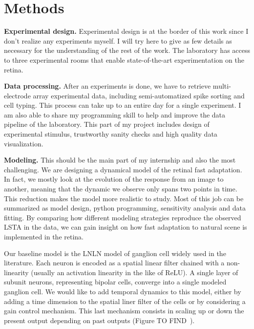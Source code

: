 \section{Methods}\label{sec:methods}

\textbf{Experimental design.}
Experimental design is at the border of this work since I don't realize any
experiments myself. I will try here to give as few details as necessary for the
understanding of the rest of the work.
The laboratory has access to three experimental rooms that enable
state-of-the-art experimentation
on the retina.

\tab\textbf{Data processing.}
After an experiments is done, we have to retrieve multi-electrode array
experimental data, including semi-automatized spike sorting and cell typing.
This process can take up to an entire day for a single experiment. I am also
able to share my programming skill to help and improve the data pipeline of the
laboratory. This part of my project includes design of experimental stimulus,
trustworthy sanity checks and high quality data visualization.

\textbf{Modeling.} This should be the main part of my internship and also the
most challenging. We are designing a dynamical model of the retinal fast
adaptation. In fact, we mostly look at the evolution of the response from an
image to another, meaning that the dynamic we observe only spans two points in
time. This reduction makes the model more realistic to study. Most of this job
can be summarized as model design, python programming, sensitivity analysis and
data fitting. By comparing how different modeling strategies reproduce the
observed LSTA in the data, we can gain insight on how fast adaptation to
natural scene is implemented in the retina.

Our baseline model is the LNLN model of ganglion cell widely used in the
literature. Each neuron is encoded as a spatial linear filter chained with a
non-linearity (usually an activation linearity in the like of ReLU). A single
layer of subunit neurons, representing bipolar cells, converge into a single
modeled ganglion cell.	We would like to add temporal dynamics to this model,
either by adding a time dimension to the spatial liner filter of the cells or
by considering a gain control mechanism. This last mechanism consists in
scaling up or down the present output depending on past outputs (Figure
TO FIND~\cite{}).

